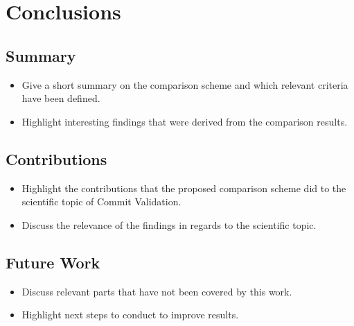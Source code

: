 \section{Conclusions}
\label{sec:conclusions}

\subsection{Summary}
\begin{itemize}
	\item Give a short summary on the comparison scheme and which relevant criteria have been defined.
	\item Highlight interesting findings that were derived from the comparison results.
\end{itemize}

\subsection{Contributions}
\begin{itemize}
	\item Highlight the contributions that the proposed comparison scheme did to the scientific topic of Commit Validation.
	\item Discuss the relevance of the findings in regards to the scientific topic.
\end{itemize}

\subsection{Future Work}
\begin{itemize}
	\item Discuss relevant parts that have not been covered by this work.
	\item Highlight next steps to conduct to improve results.
\end{itemize}
